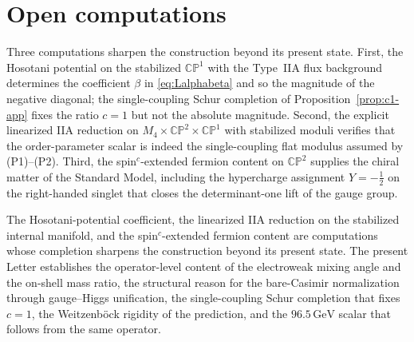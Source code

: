 \documentclass[aps,prd,onecolumn,superscriptaddress,nofootinbib,reprint]{revtex4-2}
\newcommand{\half}{\tfrac12}
\newcommand{\CP}{\mathbb{CP}}
\begin{document}
\section{Open computations}
\label{app:open}

Three computations sharpen the construction beyond its present state.
First, the Hosotani potential on the stabilized $\CP^{1}$ with the
Type~IIA flux background determines the coefficient $\beta$ in
\eqref{eq:Lalphabeta} and so the magnitude of the negative diagonal;
the single-coupling Schur completion of Proposition~\ref{prop:c1-app}
fixes the ratio $c=1$ but not the absolute magnitude.  Second, the
explicit linearized IIA reduction on $M_{4}\times\CP^{2}\times\CP^{1}$
with stabilized moduli verifies that the order-parameter scalar is
indeed the single-coupling flat modulus assumed by (P1)--(P2).  Third,
the spin$^{c}$-extended fermion content on $\CP^{2}$ supplies the
chiral matter of the Standard Model, including the hypercharge
assignment $Y=-\half$ on the right-handed singlet that closes the
determinant-one lift of the gauge group.

The Hosotani-potential coefficient, the linearized IIA reduction on
the stabilized internal manifold, and the spin$^{c}$-extended fermion
content are computations whose completion sharpens the construction
beyond its present state.  The present Letter establishes the
operator-level content of the electroweak mixing angle and the
on-shell mass ratio, the structural reason for the bare-Casimir
normalization through gauge--Higgs unification, the single-coupling
Schur completion that fixes $c=1$, the Weitzenb\"ock rigidity of the
prediction, and the $96.5\,\text{GeV}$ scalar that follows from the
same operator.
\end{document}
